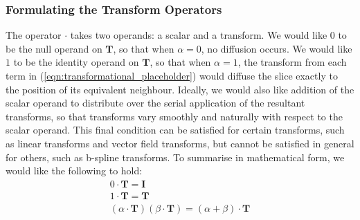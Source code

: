     \subsubsection{Formulating the Transform Operators} %
    \label{ssub:formulating_the_transform_operators}
		The operator $\cdot$ takes two operands: a scalar and a transform. We would like $0$ to be the null operand on $\mathbf{T}$, so that when $\alpha = 0$, no diffusion occurs. We would like $1$ to be the identity operand on $\mathbf{T}$, so that when $\alpha = 1$, the transform from each term in (\ref{eqn:transformational_placeholder}) would diffuse the slice exactly to the position of its equivalent neighbour. Ideally, we would also like addition of the scalar operand to distribute over the serial application of the resultant transforms, so that transforms vary smoothly and naturally with respect to the scalar operand. This final condition can be satisfied for certain transforms, such as linear transforms and vector field transforms, but cannot be satisfied in general for others, such as b-spline transforms. To summarise in mathematical form, we would like the following to hold:
		\begin{gather}
			0 \cdot \mathbf{T} = \mathbf{I} \label{eqn:null} \\
			1 \cdot \mathbf{T} = \mathbf{T} \label{eqn:identity} \\
			(\alpha \cdot \mathbf{T}) (\beta \cdot \mathbf{T}) = (\alpha + \beta) \cdot \mathbf{T} \label{eqn:distributivity}
		\end{gather}
	 	
